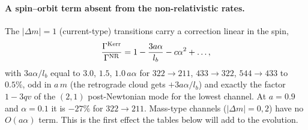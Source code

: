 \documentclass[11pt]{article}
\begin{document}
\paragraph{A spin--orbit term absent from the non-relativistic rates.}
The $|\Delta m|=1$ (current-type) transitions carry a correction linear in the spin,
\begin{equation}
\frac{\Gamma^{\rm Kerr}}{\Gamma^{\rm NR}}=1-\frac{3a\alpha}{l_b}-c\alpha^2+\dots,
\end{equation}
with $3a\alpha/l_b$ equal to $3.0$, $1.5$, $1.0\,a\alpha$ for $322\to211$, $433\to322$, $544\to433$ to $0.5\%$, odd in $a\,m$ (the retrograde cloud gets $+3a\alpha/l_b$) and exactly the factor $1-3qv$ of the $(2,1)$ post-Newtonian mode for the lowest channel. At $a=0.9$ and $\alpha=0.1$ it is $-27\%$ for $322\to211$. Mass-type channels ($|\Delta m|=0,2$) have no $O(a\alpha)$ term. This is the first effect the tables below will add to the evolution.
\end{document}
